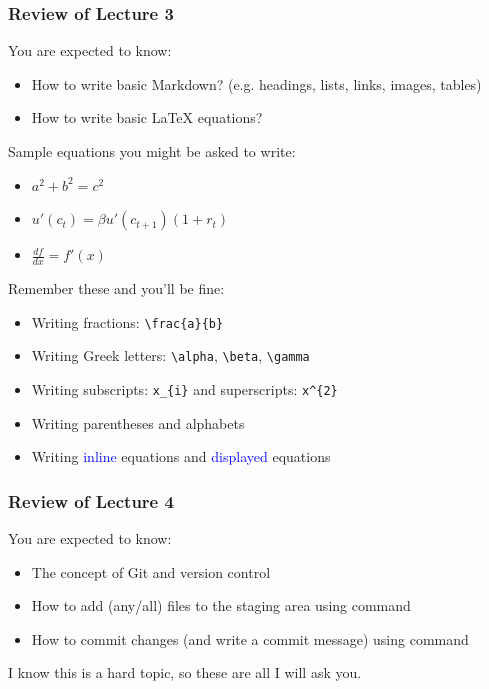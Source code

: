 \documentclass[10pt]{beamer}
\begin{document}
\begin{frame}
	\frametitle{Review of Lecture 3}

	You are expected to know:
	\begin{itemize}
		\item How to write basic Markdown? (e.g. headings, lists, links, images, tables)
		\item How to write basic LaTeX equations?
	\end{itemize}

	Sample equations you might be asked to write:
	\begin{itemize}
		\item $a^2 + b^2 = c^2$
		\item $u'(c_t) = \beta u'(c_{t+1})  \left(1 + r_t\right)$
		\item $\frac{df}{dx} = f'(x)$
	\end{itemize}

	Remember these and you'll be fine:
	\begin{itemize}
		\item Writing fractions: \texttt{\textbackslash frac\{a\}\{b\}}
		\item Writing Greek letters: \texttt{\textbackslash alpha}, \texttt{\textbackslash beta}, \texttt{\textbackslash gamma}
		\item Writing subscripts: \texttt{x\_\{i\}} and superscripts: \texttt{x\^{}\{2\}}
		\item Writing parentheses and alphabets
		\item Writing \textcolor{blue}{inline} equations and \textcolor{blue}{displayed} equations
	\end{itemize}
\end{frame}

\begin{frame}
	\frametitle{Review of Lecture 4}

	You are expected to know:
	\begin{itemize}
		\item The concept of Git and version control
		\item How to add (any/all) files to the staging area using command
		\item How to commit changes (and write a commit message) using command
	\end{itemize}

	I know this is a hard topic, so these are all I will ask you.
\end{frame}
\end{document}
